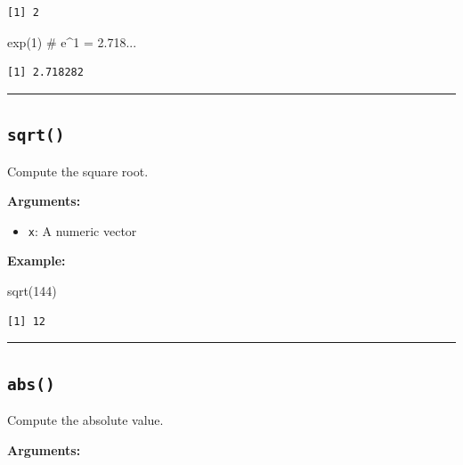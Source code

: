\documentclass[
  letterpaper,
  DIV=11,
  numbers=noendperiod]{scrreprt}
\newenvironment{Shaded}{\begin{snugshade}}{\end{snugshade}}
\newcommand{\CommentTok}[1]{\textcolor[rgb]{0.37,0.37,0.37}{#1}}
\newcommand{\DecValTok}[1]{\textcolor[rgb]{0.68,0.00,0.00}{#1}}
\newcommand{\FunctionTok}[1]{\textcolor[rgb]{0.28,0.35,0.67}{#1}}
\newcommand{\NormalTok}[1]{\textcolor[rgb]{0.00,0.23,0.31}{#1}}
\providecommand{\tightlist}{%
  \setlength{\itemsep}{0pt}\setlength{\parskip}{0pt}}
\begin{document}
\begin{verbatim}
[1] 2
\end{verbatim}

\begin{Shaded}
\begin{Highlighting}[]
\FunctionTok{exp}\NormalTok{(}\DecValTok{1}\NormalTok{)          }\CommentTok{\# e\^{}1 = 2.718...}
\end{Highlighting}
\end{Shaded}

\begin{verbatim}
[1] 2.718282
\end{verbatim}

\begin{center}\rule{0.5\linewidth}{0.5pt}\end{center}

\subsection{\texorpdfstring{\texttt{sqrt()}}{sqrt()}}\label{sqrt}

Compute the square root.

\textbf{Arguments:}

\begin{itemize}
\tightlist
\item
  \texttt{x}: A numeric vector
\end{itemize}

\textbf{Example:}

\begin{Shaded}
\begin{Highlighting}[]
\FunctionTok{sqrt}\NormalTok{(}\DecValTok{144}\NormalTok{)}
\end{Highlighting}
\end{Shaded}

\begin{verbatim}
[1] 12
\end{verbatim}

\begin{center}\rule{0.5\linewidth}{0.5pt}\end{center}

\subsection{\texorpdfstring{\texttt{abs()}}{abs()}}\label{abs}

Compute the absolute value.

\textbf{Arguments:}
\end{document}

